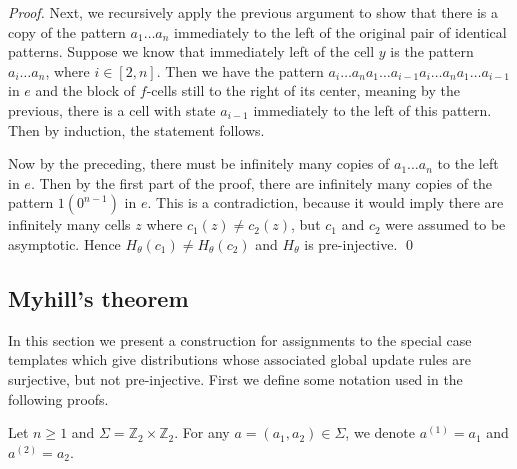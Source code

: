 \documentclass[runningheads]{llncs}
\newcommand{\Z}{\mathbb{Z}}
\begin{document}
\begin{proof}
Next, we recursively apply the previous argument to show that there is a copy of the pattern $a_1\ldots a_n$ immediately to the left of the original pair of identical patterns. Suppose we know that immediately left of the cell $y$ is the pattern $a_i\ldots a_n$, where $i \in [2,n]$. Then we have the pattern $a_i\ldots a_n a_1 \ldots a_{i-1} a_i\ldots a_n a_1 \ldots a_{i-1}$ in $e$ and the block of $f$-cells still to the right of its center, meaning by the previous, there is a cell with state $a_{i-1}$ immediately to the left of this pattern. Then by induction, the statement follows.

Now by the preceding, there must be infinitely many copies of $a_1\ldots a_n$ to the left in $e$. Then by the first part of the proof, there are infinitely many copies of the pattern $1(0^{n-1})$ in $e$. This is a contradiction, because it would imply there are infinitely many cells $z$ where $c_1(z) \neq c_2(z)$, but $c_1$ and $c_2$ were assumed to be asymptotic. Hence $H_\theta(c_1) \neq H_\theta (c_2)$ and $H_\theta$ is pre-injective. 
\qed
\end{proof}

\subsection{Myhill's theorem}

In this section we present a construction for assignments to the special case templates which give distributions whose associated global update rules are surjective, but not pre-injective. First we define some notation used in the following proofs.

\begin{notation}
Let $n\geq 1$ and $\Sigma = \Z_2 \times \Z_2$. For any $a=(a_1,a_2) \in \Sigma$, we denote $a^{(1)} = a_1$ and $a^{(2)} = a_2$.
\end{notation}
\end{document}
